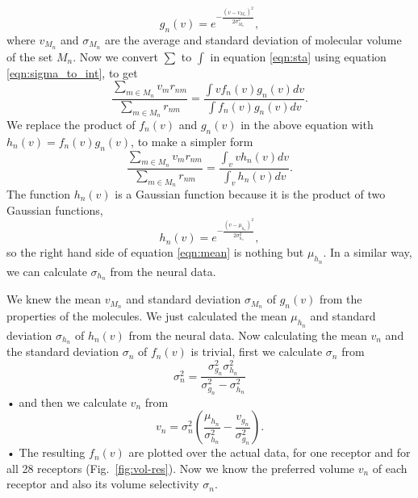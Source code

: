 \documentclass[11pt]{paper} %
\begin{document}
\begin{equation}
	g_n(v) = e^{-\frac{(v- v_{M_n})^2}{2\sigma_{M_n}^2}},
	\label{eqn:hist-volumes}
\end{equation}
where $v_{M_n}$ and $\sigma_{M_n}$ are the average and standard deviation of molecular volume of the set $M_n$.
Now we convert $\sum$ to $\int$ in equation \ref{eqn:sta} using equation \ref{eqn:sigma_to_int}, to get
\begin{equation}
	\frac{\displaystyle \sum_{m\in M_n} v_m r_{nm}}{\displaystyle \sum_{m\in M_n} r_{nm}} = \frac{\displaystyle \int v f_n(v) g_n(v) dv}{\displaystyle \int f_n(v) g_n(v) dv}.
	\label{eqn:sta_int}
\end{equation}
We replace the product of $f_n(v)$ and $g_n(v)$ in the above equation with $h_n(v) = f_n(v) g_n(v)$, to make a simpler form
\begin{equation}
	\frac{\displaystyle \sum_{m\in M_n} v_m r_{nm}}{\displaystyle \sum_{m\in M_n} r_{nm}} = \frac{\displaystyle \int_v v h_n(v) dv}{ \displaystyle \int_v  h_n(v) dv }.
	\label{eqn:mean}
\end{equation}
The function $h_n(v)$ is a Gaussian function because it is the product of two Gaussian functions, 
\begin{equation}
h_n(v) = e^{-\frac{(v-\mu_{h_n})^2}{2\sigma_{h_n}^2}}, 
\end{equation}
so the right hand side of equation \ref{eqn:mean} is nothing but $\mu_{h_n}$. 
In a similar way, we can calculate $\sigma_{h_n}$ from the neural data.

We knew the mean $v_{M_n}$ and standard deviation $\sigma_{M_n}$ of $g_n(v)$ from the properties of the molecules. 
We just calculated the mean $\mu_{h_n}$ and standard deviation $\sigma_{h_n}$ of $h_n(v)$ from the neural data.
Now calculating the mean $v_n$ and the standard deviation $\sigma_n$ of $f_n(v)$ is trivial,
first we calculate $\sigma_n$ from 
\begin{equation}
	\sigma_n^2 = \frac{\sigma^2_{g_n} \sigma^2_{h_n}}{\sigma^2_{g_n} - \sigma^2_{h_n}}
\end{equation}•
and then we calculate $v_n$ from 
\begin{equation}
	v_n =  \sigma_n^2 \left ( \frac{\mu_{h_n}}{\sigma^2_{h_n}} - \frac{v_{g_n}}{\sigma^2_{g_n}} \right ).
\end{equation}•
The resulting $f_n(v)$ are plotted over the actual data, for one receptor and for all 28 receptors (Fig.~\ref{fig:vol-res}).
Now we know the preferred volume $v_n$ of each receptor and also its volume selectivity $\sigma_n$.
\end{document}
